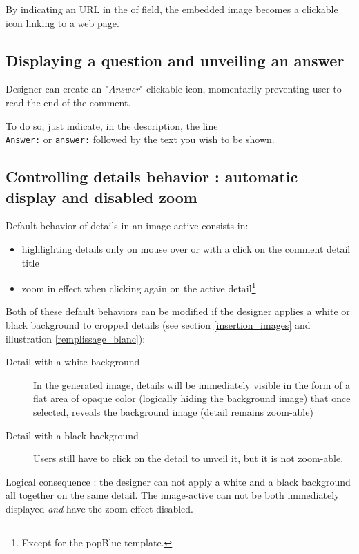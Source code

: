 By indicating an URL in the  of  field, 
the embedded image becomes a clickable icon linking to a web page.

\subsection{Displaying a question and unveiling an answer}

Designer can create an "\textit{Answer}" clickable icon, momentarily 
preventing user to read the end of the comment.

To do so, just indicate, in the description, the line\\ \verb|Answer:| or 
\verb|answer:| followed by the text you wish to be shown.

\subsection{Controlling details behavior : automatic display and disabled zoom}
\label{couche_XML}

Default behavior of details in an image-active consists in:
\begin{itemize}
 \item highlighting details only on mouse over or with a click on the comment 
 detail title
 \item zoom in effect when clicking again on the active detail\footnote{Except 
 for the popBlue template.}
\end{itemize}

Both of these default behaviors can be modified if the designer applies a white
 or black background to cropped details (see section 
\ref{insertion_images} 
 and illustration 
\ref{remplissage_blanc}):
\begin{description}
 \item [Detail with a white background] In the generated image, details will be
 immediately visible in the form of a flat area of opaque color (logically hiding the background image) that once selected, reveals the background image (detail remains zoom-able)
 \item [Detail with a black background] Users still have to click on the detail to unveil it, but it is not zoom-able.
\end{description}

Logical consequence : the designer can not apply a white and a black
background all together on the same detail. The image-active can not be 
both immediately displayed \textit{and} have the zoom effect disabled.

